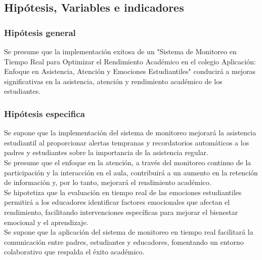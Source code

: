 \documentclass[12pt]{article}
\begin{document}
\subsection{Hipótesis, Variables e indicadores}
\subsubsection{Hipótesis general}
Se presume que la implementación exitosa de un "Sistema de Monitoreo en Tiempo Real para Optimizar el Rendimiento Académico en el colegio Aplicación: Enfoque en Asistencia, Atención y Emociones Estudiantiles" conducirá a mejoras significativas en la asistencia, atención y rendimiento académico de los estudiantes.
\subsubsection{Hipótesis especifica}
Se supone que la implementación del sistema de monitoreo mejorará la asistencia estudiantil al proporcionar alertas tempranas y recordatorios automáticos a los padres y estudiantes sobre la importancia de la asistencia regular.\\
Se presume que el enfoque en la atención, a través del monitoreo continuo de la participación y la interacción en el aula, contribuirá a un aumento en la retención de información y, por lo tanto, mejorará el rendimiento académico.\\
Se hipotetiza que la evaluación en tiempo real de las emociones estudiantiles permitirá a los educadores identificar factores emocionales que afectan el rendimiento, facilitando intervenciones específicas para mejorar el bienestar emocional y el aprendizaje.\\
Se supone que la aplicación del sistema de monitoreo en tiempo real facilitará la comunicación entre padres, estudiantes y educadores, fomentando un entorno colaborativo que respalda el éxito académico.
\end{document}
